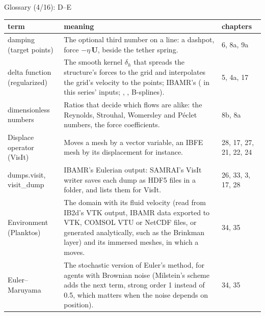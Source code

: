 \documentclass[aspectratio=169,11pt]{beamer}
\makeatletter
\newenvironment{glossarytable}{\scriptsize\renewcommand{\arraystretch}{1.08}%
  \begin{tabular}{@{}L{0.19\textwidth}L{0.63\textwidth}L{0.12\textwidth}@{}}\toprule
  term & meaning & chapters\\\midrule}{\bottomrule\end{tabular}}
\makeatother
\begin{document}
\begin{frame}{Glossary (4/16): D--E}
\label{fr:g4}
\begin{glossarytable}
damping (target points) & The optional third number on a  line: a dashpot, force $-\eta\,\mathbf{U}$, beside the tether spring. & 6, 8a, 9a\\
delta function (regularized) & The smooth kernel $\delta_h$ that spreads the structure's forces to the grid and interpolates the grid's velocity to the points; IBAMR's  ( in this series' inputs; , , B-splines). & 5, 4a, 17\\
dimensionless numbers & Ratios that decide which flows are alike: the Reynolds, Strouhal, Womersley and P\'eclet numbers, the force coefficients. & 8b, 8a\\
Displace operator (VisIt) & Moves a mesh by a vector variable, an IBFE mesh by its displacement  for instance. & 28, 17, 27, 21, 22, 24\\
dumps.visit, visit\_dump & IBAMR's Eulerian output: SAMRAI's VisIt writer saves each dump as HDF5 files in a  folder, and  lists them for VisIt. & 26, 33, 3, 17, 28\\
Environment (Planktos) & The domain with its fluid velocity (read from IB2d's VTK output, IBAMR data exported to VTK, COMSOL VTU or NetCDF files, or generated analytically, such as the Brinkman layer) and its immersed meshes, in which a  moves. & 34, 35\\
Euler--Maruyama & The stochastic version of Euler's method, for agents with Brownian noise (Milstein's scheme adds the next term, strong order 1 instead of 0.5, which matters when the noise depends on position). & 34, 35\\
\end{glossarytable}
\end{frame}
\end{document}
